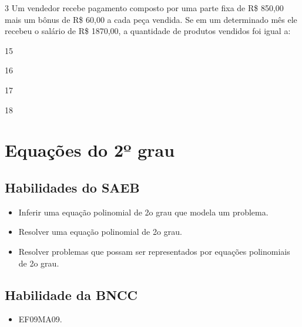 \pagebreak
\num{3} Um vendedor recebe pagamento composto por uma parte fixa de R\$
850,00 mais um bônus de R\$ 60,00 a cada peça vendida. Se em um
determinado mês ele recebeu o salário de R\$ 1870,00, a
quantidade de produtos vendidos foi igual a:

\begin{escolha}
  \item 15

  \item 16

  \item 17

  \item 18
\end{escolha}

\chapter{Equações do 2º grau}

\section{Habilidades do SAEB}

\begin{itemize}
  \item Inferir uma equação polinomial de 2o grau que modela um problema.
  \item Resolver uma equação polinomial de 2o grau.
  \item Resolver problemas que possam ser representados por equações
polinomiais de 2o grau.   
\end{itemize} 

\section*{Habilidade da BNCC}

\begin{itemize}
  \item EF09MA09.
\end{itemize}

